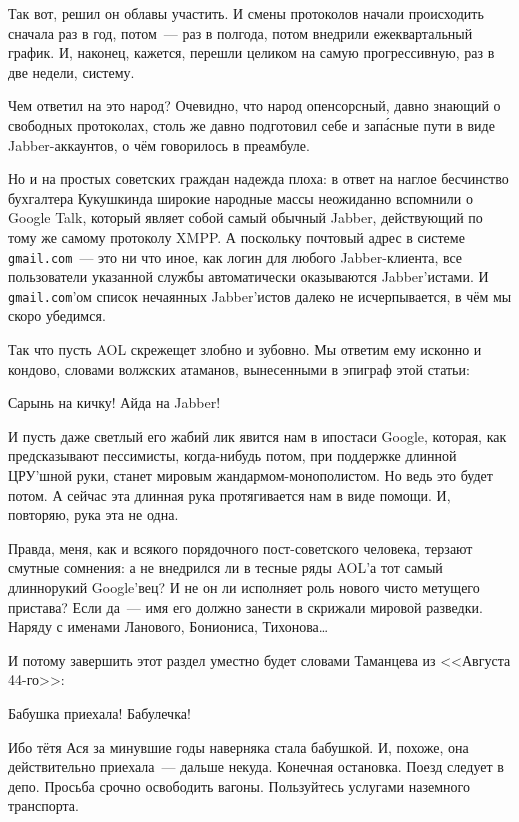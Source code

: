 Так вот, решил он облавы участить. И смены протоколов начали происходить сначала раз в год, потом~--- раз в полгода, потом внедрили ежеквартальный график. И, наконец, кажется, перешли целиком на самую прогрессивную, раз в две недели, систему. 

Чем ответил на это народ? Очевидно, что народ опенсорсный, давно знающий о свободных протоколах, столь же давно подготовил себе и зап\'{а}сные пути в виде Jabber-аккаунтов, о чём говорилось в преамбуле. 

Но и на простых советских граждан надежда плоха: в ответ на наглое бесчинство бухгалтера Кукушкинда широкие народные массы неожиданно вспомнили о Google Talk, который являет собой самый обычный Jabber, действующий по тому же самому протоколу XMPP. А поскольку почтовый адрес в системе \texttt{gmail.com}~--- это ни что иное, как логин для любого Jabber-клиента, все пользователи указанной службы автоматически оказываются Jabber'истами. И \texttt{gmail.com}'ом список нечаянных Jabber'истов далеко не исчерпывается, в чём мы скоро убедимся. 

Так что пусть AOL скрежещет злобно и зубовно. Мы ответим ему исконно и кондово, словами волжских атаманов, вынесенными в эпиграф этой статьи: 


\begin{shadequote}{}
Сарынь на кичку! Айда на Jabber!
\end{shadequote}

И пусть даже светлый его жабий лик явится нам в ипостаси Google, которая, как предсказывают пессимисты, когда-нибудь потом, при поддержке длинной ЦРУ'шной руки, станет мировым жандармом-монополистом. Но ведь это будет потом. А сейчас эта длинная рука протягивается нам в виде помощи. И, повторяю, рука эта не одна. 

Правда, меня, как и всякого порядочного пост-советского человека, терзают смутные сомнения: а не внедрился ли в тесные ряды AOL'а тот самый длиннорукий Google'вец? И не он ли исполняет роль нового чисто метущего пристава? Если да~--- имя его должно занести в скрижали мировой разведки. Наряду с именами Ланового, Бониониса, Тихонова\dots 

И потому завершить этот раздел уместно будет словами Таманцева из <<Августа 44-го>>: 


\begin{shadequote}{}
Бабушка приехала! Бабулечка!
\end{shadequote}

Ибо тётя Ася за минувшие годы наверняка стала бабушкой. И, похоже, она действительно приехала~--- дальше некуда. Конечная остановка. Поезд следует в депо. Просьба срочно освободить вагоны. Пользуйтесь услугами наземного транспорта. 


